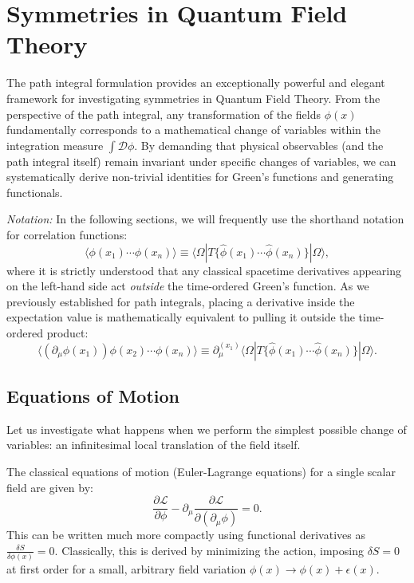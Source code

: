 \section{Symmetries in Quantum Field Theory}

The path integral formulation provides an exceptionally powerful and elegant framework for investigating symmetries in Quantum Field Theory. From the perspective of the path integral, any transformation of the fields $\phi(x)$ fundamentally corresponds to a mathematical change of variables within the integration measure $\int \mathcal{D}\phi$. By demanding that physical observables (and the path integral itself) remain invariant under specific changes of variables, we can systematically derive non-trivial identities for Green's functions and generating functionals.

\textit{Notation:} In the following sections, we will frequently use the shorthand notation for correlation functions:
\[
    \langle \phi(x_1) \cdots \phi(x_n) \rangle \equiv \langle \Omega | T \{ \hat{\phi}(x_1) \cdots \hat{\phi}(x_n) \} | \Omega \rangle,
\]
where it is strictly understood that any classical spacetime derivatives appearing on the left-hand side act \textit{outside} the time-ordered Green's function. As we previously established for path integrals, placing a derivative inside the expectation value is mathematically equivalent to pulling it outside the time-ordered product:
\[
    \langle (\partial_\mu \phi(x_1)) \phi(x_2) \cdots \phi(x_n) \rangle \equiv \partial_\mu^{(x_1)} \langle \Omega | T \{ \hat{\phi}(x_1) \cdots \hat{\phi}(x_n) \} | \Omega \rangle.
\]

\subsection{Equations of Motion}

Let us investigate what happens when we perform the simplest possible change of variables: an infinitesimal local translation of the field itself.

The classical equations of motion (Euler-Lagrange equations) for a single scalar field are given by:
\[
    \frac{\partial \mathcal{L}}{\partial \phi} - \partial_\mu \frac{\partial \mathcal{L}}{\partial (\partial_\mu \phi)} = 0.
\]
This can be written much more compactly using functional derivatives as $\frac{\delta S}{\delta \phi(x)} = 0$. Classically, this is derived by minimizing the action, imposing $\delta S = 0$ at first order for a small, arbitrary field variation $\phi(x) \to \phi(x) + \epsilon(x)$.

